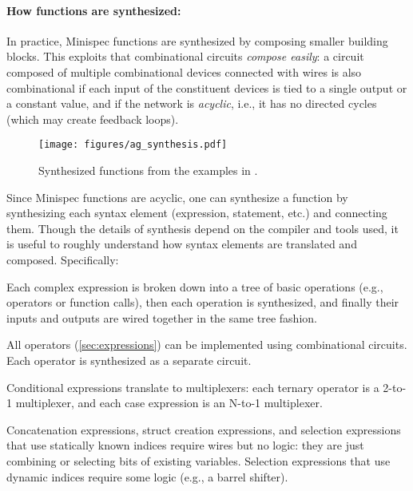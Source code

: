 \paragraph{How functions are synthesized:}
In practice, Minispec functions are synthesized by composing smaller building blocks.
This exploits that combinational circuits \emph{compose easily}:
a circuit composed of multiple combinational devices connected with wires is also combinational
if each input of the constituent devices is tied to a single output or a constant value,
and if the network is \emph{acyclic}, i.e., it has no directed cycles
(which may create feedback loops).

\begin{wrapfigure}{r}{0.34\columnwidth}
\vspace{-2.5em}
\centering
\texttt{[image: figures/ag\_synthesis.pdf]}
\caption{Synthesized functions from the examples in .}
\label{fig:synthesis}
\vspace{-1.5em}
\end{wrapfigure}
Since Minispec functions are acyclic, one can synthesize a function by synthesizing each syntax element
(expression, statement, etc.) and connecting them.
Though the details of synthesis depend on the compiler and tools used,
it is useful to roughly understand how syntax elements are translated and composed.
Specifically:
\begin{compactitem}
\item Each complex expression is broken down into a tree of basic operations (e.g., operators or function calls), then each operation is synthesized,
  and finally their inputs and outputs are wired together in the same tree fashion.
\item All operators (\autoref{sec:expressions}) can be implemented using combinational circuits.
  Each operator is synthesized as a separate circuit.
\item Conditional expressions translate to multiplexers: each ternary operator is a 2-to-1 multiplexer, and each case expression is an N-to-1 multiplexer.
\item Concatenation expressions, struct creation expressions, and selection expressions that use statically known indices require wires but no logic:
  they are just combining or selecting bits of existing variables.
  Selection expressions that use dynamic indices require some logic (e.g., a barrel shifter).
\end{compactitem}
